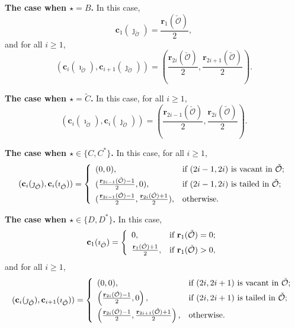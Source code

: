 \documentclass[12pt,a4paper]{amsart}
\newcommand{\CO}{{\mathcal {O}}}
\numberwithin{equation}{section}
\theoremstyle{remark}
\begin{document}
\medskip

\noindent
{\bf The case when $\star=B$.} In this case,
 \[
   \mathbf c_{1}(\jmath_{\check \CO})=\frac{\mathbf r_1(\check \CO)}{2},
\]
and for all $i\geq 1$,
\[
\left (\mathbf c_{i}(\imath_{\check \CO}), \mathbf c_{i+1}(\jmath_{\check \CO})\right )=
            \left (\frac{\mathbf r_{2i}(\check \CO)}{2},  \frac{\mathbf r_{2i+1}(\check \CO)}{2}\right ).
\]

\medskip

\noindent
{\bf The case when $\star=\widetilde C$.} In this case, for all $i\geq 1$,
\[
(\mathbf c_{i}(\imath_{\check \CO}), \mathbf c_{i}(\jmath_{\check \CO}))=
           \left (\frac{\mathbf r_{2i-1}(\check \CO)}{2},  \frac{\mathbf r_{2i}(\check \CO)}{2}\right).
\]

\medskip

\noindent
{\bf The case when $\star\in \{C,C^*\}$.} In this case, for all $i\geq 1$,
\[
(\mathbf c_{i}(\jmath_{\check \CO}), \mathbf c_{i}(\imath_{\check \CO}))=
   \left\{
     \begin{array}{ll}
        (0,  0), &\hbox{if $(2i-1, 2i)$ is vacant  in $\check \CO$};\smallskip\\
        (\frac{\mathbf r_{2i-1}(\check \CO)-1}{2},  0), & \hbox{if $(2i-1, 2i)$ is tailed in $\check \CO$};\smallskip\\
                  (\frac{\mathbf r_{2i-1}(\check \CO)-1}{2},  \frac{\mathbf r_{2i}(\check \CO)+1}{2}), &\hbox{otherwise}.\\
            \end{array}
   \right.
\]
\medskip

\noindent
{\bf The case when $\star\in \{D,D^*\}$.} In this case,
 \[
   \mathbf c_{1}(\imath_{\check \CO})= \left\{
     \begin{array}{ll}
      0,  &\hbox{if $\mathbf r_1(\check \CO)=0$}; \smallskip\\
       \frac{\mathbf r_1(\check \CO)+1}{2},   &\hbox{if $\mathbf r_1(\check \CO)>0$},\\
            \end{array}
   \right.
 \]
and for all $i\geq 1$,
\[
(\mathbf c_{i}(\jmath_{\check \CO}), \mathbf c_{i+1}(\imath_{\check \CO}))=
   \left\{
     \begin{array}{ll}
        (0,  0), &\hbox{if $(2i, 2i+1)$ is vacant in $\check \CO$};\smallskip\\
      \left  (\frac{\mathbf r_{2i}(\check \CO)-1}{2},  0\right ), & \hbox{if $(2i, 2i+1)$ is tailed in $\check \CO$};\smallskip\\
                \left  (\frac{\mathbf r_{2i}(\check \CO)-1}{2},  \frac{\mathbf r_{2i+1}(\check \CO)+1}{2}\right ), &\hbox{otherwise}.\\
            \end{array}
   \right.
\]
\end{document}
